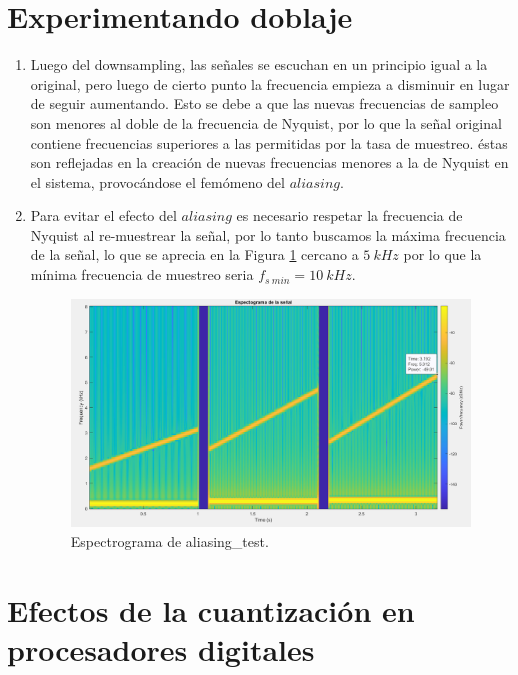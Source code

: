 \documentclass[letterpaper,onecolumn,10pt,journal,final]{IEEEtran}
\begin{document}
\section{Experimentando doblaje}

\begin{enumerate}[{1)}]
    \item 
    Luego del downsampling, las señales se escuchan en un principio igual a la original, pero luego de cierto punto la frecuencia empieza a disminuir en lugar de seguir aumentando. Esto se debe a que las nuevas frecuencias de sampleo son menores al doble de la frecuencia de Nyquist, por lo que la señal original contiene frecuencias superiores a las permitidas por la tasa de muestreo. éstas son reflejadas en la creación de nuevas frecuencias menores a la de Nyquist en el sistema, provocándose el femómeno del $aliasing$.
    \item Para evitar el efecto del $aliasing$ es necesario respetar la frecuencia de Nyquist al re-muestrear la señal, por lo tanto buscamos la máxima frecuencia de la señal, lo que se aprecia en la Figura \ref{IV2} cercano a $5~kHz$ por lo que la mínima frecuencia de muestreo seria $f_{s~min} = 10~kHz$.
    \begin{figure}[H]
    \centering
    \includegraphics[scale=0.4]{Figuras/plotIV2.png}
    \caption{Espectrograma de aliasing\_test.}\label{IV2}
    \end{figure}
\end{enumerate}

%
%
\section{Efectos de la cuantización en procesadores digitales}
\end{document}

